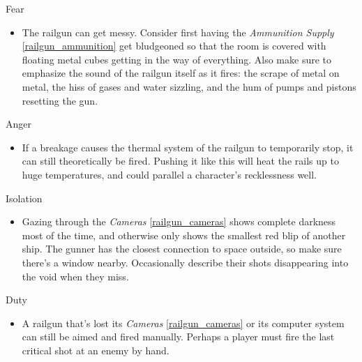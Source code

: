\documentclass[a4paper]{article}
\begin{document}
\vspace{0.3cm}
\begin{minipage}[t]{0.4\linewidth}
Fear
\begin{itemize}
\item The railgun can get messy. Consider first having the \textit{Ammunition Supply} \ref{railgun_ammunition} get bludgeoned so that the room is covered with floating metal cubes getting in the way of everything. Also make sure to emphasize the sound of the railgun itself as it fires: the scrape of metal on metal, the hiss of gases and water sizzling, and the hum of pumps and pistons resetting the gun.
\end{itemize}
\end{minipage} 
\begin{minipage}[t]{0.4\linewidth}
Anger
\begin{itemize}
\item If a breakage causes the thermal system of the railgun to temporarily stop, it can still theoretically be fired. Pushing it like this will heat the rails up to huge temperatures, and could parallel a character's recklessness well.
\end{itemize}
\end{minipage}

\begin{minipage}[t]{0.4\linewidth}
Isolation
\begin{itemize}
\item Gazing through the \textit{Cameras} \ref{railgun_cameras} shows complete darkness most of the time, and otherwise only shows the smallest red blip of another ship. The gunner has the closest connection to space outside, so make sure there's a window nearby. Occasionally describe their shots disappearing into the void when they miss.
\end{itemize}
\end{minipage}
\begin{minipage}[t]{0.4\linewidth}
Duty
\begin{itemize}
\item A railgun that's lost its \textit{Cameras} \ref{railgun_cameras} or its computer system can still be aimed and fired manually. Perhaps a player must fire the last critical shot at an enemy by hand. 
\end{itemize}
\end{minipage}
\end{document}
